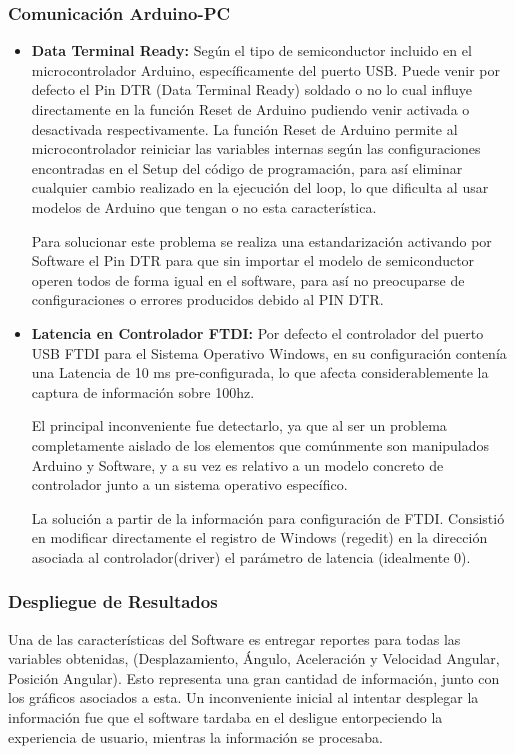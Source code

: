 \documentclass[12pt,a4paper]{article}
\begin{document}
\subsubsection{Comunicación Arduino-PC}
\begin{itemize}
	\item \textbf{Data Terminal Ready:} Según el tipo de semiconductor incluido en el microcontrolador Arduino, específicamente del puerto USB. Puede venir por defecto el Pin DTR (Data Terminal Ready) soldado o no lo cual influye directamente en la función Reset de Arduino pudiendo venir activada o desactivada respectivamente. 
	La función Reset de Arduino permite al microcontrolador reiniciar las variables internas según las configuraciones encontradas en el Setup del código de programación, para así eliminar cualquier cambio realizado en la ejecución del loop, lo que dificulta al usar modelos de Arduino que tengan o no esta característica.
	
	Para solucionar este problema se realiza una estandarización activando por Software el Pin DTR para que sin importar el modelo de semiconductor operen todos de forma igual en el software, para así no preocuparse de configuraciones o errores producidos debido al PIN DTR.

	\newpage
	\item \textbf{Latencia en Controlador FTDI:} Por defecto el controlador del puerto USB FTDI para el Sistema Operativo Windows, en su configuración contenía una Latencia de 10 ms pre-configurada, lo que afecta considerablemente la captura de información sobre 100hz. 
	
	El principal inconveniente fue detectarlo, ya que al ser un problema completamente aislado de los elementos que comúnmente son manipulados Arduino y Software, y a su vez es relativo a un modelo concreto de controlador junto a un sistema operativo específico.
	
	La solución a partir de la información para configuración de FTDI\cite{FTDI}. Consistió en modificar directamente el registro de Windows (regedit) en la dirección asociada al controlador(driver) el parámetro de latencia (idealmente 0).
\end{itemize}

\subsubsection{Despliegue de Resultados}
Una de las características del Software es entregar reportes para todas las variables obtenidas, (Desplazamiento, Ángulo, Aceleración y Velocidad Angular, Posición Angular). Esto representa una gran cantidad de información, junto con los gráficos asociados a esta. Un inconveniente inicial al intentar desplegar la información fue que el software tardaba en el desligue entorpeciendo la experiencia de usuario, mientras la información se procesaba.
\end{document}
